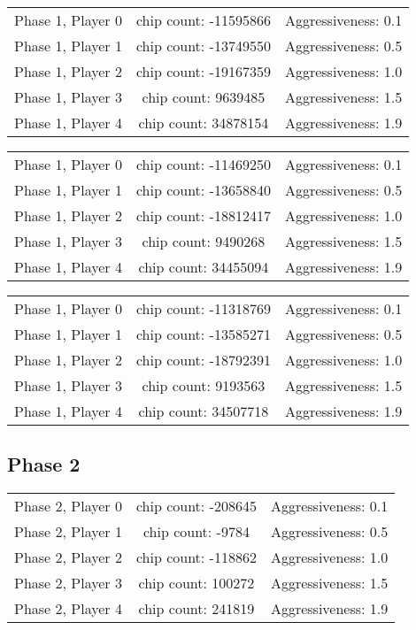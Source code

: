 \documentclass[titlepage, a4paper]{article}
\begin{document}
\begin{tabular}{| l | c | r |}
	\hline
	Phase 1, Player 0 & chip count: -11595866 & Aggressiveness: 0.1\\
	Phase 1, Player 1 & chip count: -13749550 & Aggressiveness: 0.5\\
	Phase 1, Player 2 & chip count: -19167359 & Aggressiveness: 1.0\\
	Phase 1, Player 3 & chip count: 9639485 & Aggressiveness: 1.5\\
	Phase 1, Player 4 & chip count: 34878154 & Aggressiveness: 1.9\\
	\hline
\end{tabular}

\begin{tabular}{| l | c | r |}
	\hline
	Phase 1, Player 0 & chip count: -11469250 & Aggressiveness: 0.1\\
	Phase 1, Player 1 & chip count: -13658840 & Aggressiveness: 0.5\\
	Phase 1, Player 2 & chip count: -18812417 & Aggressiveness: 1.0\\
	Phase 1, Player 3 & chip count: 9490268 & Aggressiveness: 1.5\\
	Phase 1, Player 4 & chip count: 34455094 & Aggressiveness: 1.9\\
	\hline
\end{tabular}

\begin{tabular}{| l | c | r |}
	\hline
	Phase 1, Player 0 & chip count: -11318769 & Aggressiveness: 0.1\\
	Phase 1, Player 1 & chip count: -13585271 & Aggressiveness: 0.5\\
	Phase 1, Player 2 & chip count: -18792391 & Aggressiveness: 1.0\\
	Phase 1, Player 3 & chip count: 9193563 & Aggressiveness: 1.5\\
	Phase 1, Player 4 & chip count: 34507718 & Aggressiveness: 1.9\\
	\hline
\end{tabular}

\subsection{Phase 2}\label{phase 2 results}

\begin{tabular}{| l | c | r |}
	\hline
	Phase 2, Player 0 & chip count: -208645 & Aggressiveness: 0.1\\
	Phase 2, Player 1 & chip count: -9784 & Aggressiveness: 0.5\\
	Phase 2, Player 2 & chip count: -118862 & Aggressiveness: 1.0\\
	Phase 2, Player 3 & chip count: 100272 & Aggressiveness: 1.5\\
	Phase 2, Player 4 & chip count: 241819 & Aggressiveness: 1.9\\
	\hline
\end{tabular}
\end{document}
